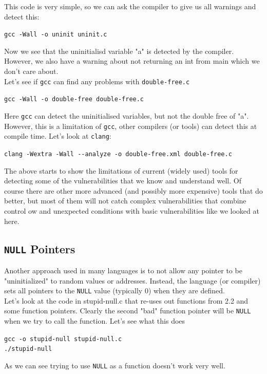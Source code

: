 \documentclass{article}
\begin{document}
\noindent This code is very simple, so we can ask the compiler to give us all warnings
and detect this:
\begin{center}
    \lstinline{gcc -Wall -o uninit uninit.c}
\end{center}
\noindent Now we see that the uninitialisd variable "a" is detected by the compiler.
However, we also have a warning about not returning an int from main
which we don't care about.\\

\noindent Let's see if \lstinline{gcc} can find any problems with \lstinline{double-free.c}
\begin{center}
    \lstinline{gcc -Wall -o double-free double-free.c}
\end{center}
\noindent  Here \lstinline{gcc} can detect the uninitialised variables, but not the double free of
"a".\\

\noindent However, this is a limitation of \lstinline{gcc}, other compilers (or tools) can detect this at compile time. Let's look at \lstinline{clang}:
\begin{center}
    \lstinline{clang -Wextra -Wall --analyze -o double-free.xml double-free.c}
\end{center}
\noindent The above starts to show the limitations of current (widely used) tools
for detecting some of the vulnerabilities that we know and understand well.
Of course there are other more advanced (and possibly more expensive) tools
that do better, but most of them will not catch complex vulnerabilities that
combine control 
ow and unexpected conditions with basic vulnerabilities
like we looked at here.

\subsection{\lstinline{NULL} Pointers}
Another approach used in many languages is to not allow any pointer to
be "uninitialized" to random values or addresses. Instead, the language (or
compiler) sets all pointers to the \lstinline{NULL} value (typically 0) when they are
defined.\\

\noindent Let's look at the code in stupid-null.c that re-uses out functions from 2.2
and some function pointers. Clearly the second "bad" function pointer will
be \lstinline{NULL} when we try to call the function. Let's see what this does
\begin{center}
    \lstinline{gcc -o stupid-null stupid-null.c}\\
    \lstinline{./stupid-null}
\end{center}
\noindent As we can see trying to use \lstinline{NULL} as a function doesn't work very well.\\
\end{document}
